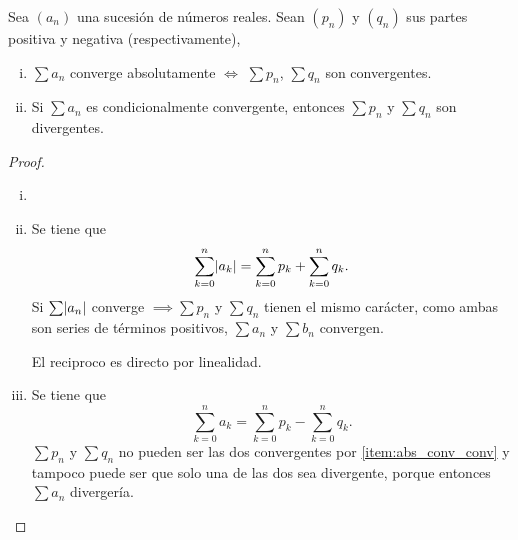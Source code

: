 \begin{example*} \hspace{0pt}
  \begin{center}
  \end{center}

\end{example*}

\begin{lema}
  Sea $(a_n)$ una sucesión de números reales. Sean $(p_n)$ y $(q_n)$ sus partes positiva y negativa
  (respectivamente),
  \begin{enumerate}[i)]
    \item \label{item:abs_conv_conv}
            $\sum a_n$ converge absolutamente $\iff$ $\sum p_n$, $\sum q_n$ son convergentes.
    \item Si $\sum a_n$ es condicionalmente convergente, entonces $\sum p_n$ y $\sum q_n$ son divergentes.
  \end{enumerate}
\end{lema}

\begin{proof}
  \begin{enumerate}[i)]
      \item[]
      \item Se tiene que
            \[
                \sum\limits_{k=0}^ n \abs{a_k} = \sum\limits_{k=0}^ n p_k + \sum\limits_{k=0}^n q_k.
        \]
        Si $\sum \abs{a_n}$ converge $\implies \sum p_n$ y $\sum q_n$ tienen el mismo carácter,
            como ambas son series de términos positivos, $\sum a_n$ y $\sum b_n$ convergen.

            El reciproco es directo por linealidad.
        \item Se tiene que
            \[
                \sum_{k=0}^n a_k = \sum_{k=0}^n p_k - \sum_{k=0}^n q_k.
            \]
            $\sum p_n$ y $\sum q_n$ no pueden ser las dos convergentes por \ref{item:abs_conv_conv}
            y tampoco puede ser que solo una de las dos sea divergente, porque entonces
            $\sum a_n$ divergería.
  \end{enumerate}
\end{proof}

